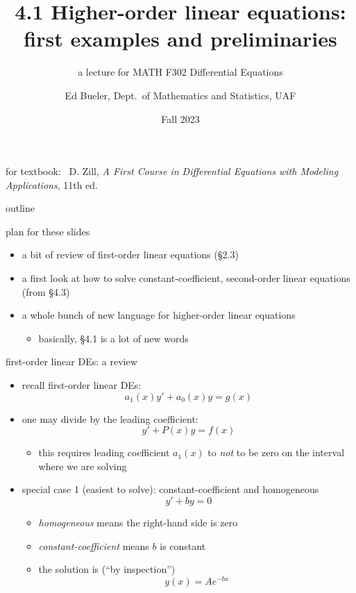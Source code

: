 \documentclass{beamer}
\title{4.1 Higher-order linear equations: \\ first examples and preliminaries \\ \phantom{x}}
\subtitle{a lecture for MATH F302 Differential Equations}
\author{Ed Bueler, Dept.~of Mathematics and Statistics, UAF}
\date{Fall 2023}
\begin{document}


\begin{frame}
\titlepage

\centerline{\tiny for textbook: \, D. Zill, \emph{A First Course in Differential Equations with Modeling Applications}, 11th ed.}
\end{frame}


\begin{frame}{outline}

plan for these slides
\begin{itemize}
\item a bit of review of first-order linear equations (\S2.3)
\item a first look at how to solve constant-coefficient, second-order linear equations (from \S4.3)
\item a whole bunch of new language for higher-order linear equations
    \begin{itemize}
    \item basically, \alert{\S4.1 is a lot of new words}
    \end{itemize}
\end{itemize}
\end{frame}


\begin{frame}{first-order linear DEs: a review}

\begin{itemize}
\item recall first-order linear DEs:
    $$a_1(x) y' + a_0(x) y = g(x)$$
\item one may divide by the leading coefficient:
    $$y' + P(x) y = f(x)$$

    \begin{itemize}
    \item \alert{this requires leading coefficient $a_1(x)$ to \emph{not} to be zero} on the interval where we are solving
    \end{itemize}
\item special case 1 (\alert{easiest to solve}): constant-coefficient and homogeneous
    $$y' + b y = 0$$

    \begin{itemize}
    \item \emph{homogeneous} means the right-hand side is zero
    \item \emph{constant-coefficient} means $b$ is constant
    \item the solution is (``by inspection'')
        $$y(x) = A e^{-bx}$$
    \end{itemize}
\end{itemize}
\end{frame}
\end{document}
